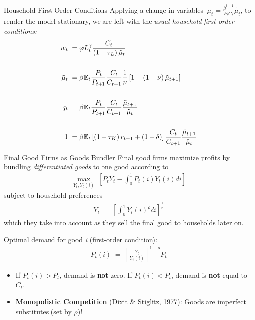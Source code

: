 \documentclass[10pt,c,aspectratio=1610,handout]{beamer}
\begin{document}
\begin{frame}{Household First-Order Conditions}%
  Applying a change-in-variables, $\mu_t = \frac{\beta^{t-1}}{P_t C_t} \tilde{\mu_t}$, to render the model stationary, we are left with the \emph{usual household first-order conditions:}%
  \begin{align}%
    w_t \; = & \; \varphi L_t^\gamma \frac{C_t}{\left(1-\tau_L\right) \tilde{\mu}_t}\\%
    \notag\\%
    \tilde{\mu}_t \; = & \; \beta \mathbb{E}_t \frac{P_t}{P_{t+1}} \frac{C_t}{C_{t+1}} \frac{1}{\nu} \left[ 1 - \left(1-\nu\right) \tilde{\mu}_{t+1} \right]\\%
    \notag\\%
    q_t \; = & \; \beta \mathbb{E}_t \frac{P_t}{P_{t+1}} \frac{C_t}{C_{t+1}} \frac{\tilde{\mu}_{t+1}}{\tilde{\mu}_t}\\%
    \notag\\%
    1 \; = & \; \beta \mathbb{E}_t \left[ \left(1-\tau_K\right) r_{t+1} + \left(1-\delta\right) \right] \frac{C_t}{C_{t+1}} \frac{\tilde{\mu}_{t+1}}{\tilde{\mu}_t}%
  \end{align}%
\end{frame}%
\begin{frame}{Final Good Firms as Goods Bundler}%
  Final good firms maximize profits by bundling \emph{differentiated goods} to one good according to%
  \begin{align*}%
    \max_{Y_t,Y_t(i)} \; \left[ {P}_t Y_t - \int_0^1 P_t(i) Y_t(i) di \right]%
  \end{align*}%
  subject to household preferences%
  \begin{align*}%
    Y_t \; = \; \left[ \int_0^1 Y_t(i)^\rho di \right]^{\frac{1}{\rho}}%
  \end{align*}%
  which they take into account as they sell the final good to households later on.\\%
  \vspace*{0.15in}%
  \pause%
  \begin{block}{Optimal demand for good \textit{i} (first-order condition):}%
    \begin{align}%
      P_t(i) \; = \; \left[ \frac{Y_t}{Y_t(i)} \right]^{1-\rho} {P}_t%
    \end{align}%
    \vspace*{-0.2in}%
    \begin{small}%
      \begin{itemize}%
        \item[$\blacktriangleright$] If $P_t(i)>P_t$, demand is \textbf{not} zero. If $P_t(i)<P_t$, demand is \textbf{not} equal to $C_t$.%
        \item[$\blacktriangleright$] \textbf{Monopolistic Competition} {\footnotesize (Dixit \& Stiglitz, 1977)}:  Goods are imperfect substitutes (set by $\rho$)!%
      \end{itemize}%
    \end{small}%
  \end{block}
\end{frame}%
\end{document}
